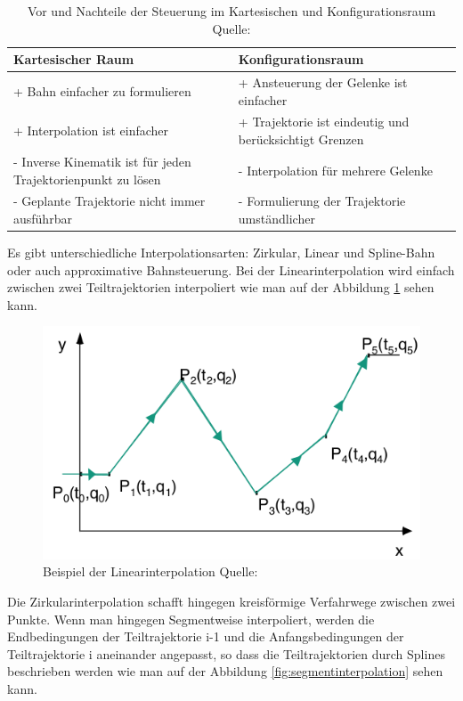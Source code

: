 \begin{table}[h]
		\centering
		\begin{tabular}{| p{7cm} | p{7cm}|}
\hline
\textbf{Kartesischer Raum} & \textbf{Konfigurationsraum}\\
\hline
+ Bahn einfacher zu formulieren & + Ansteuerung der Gelenke ist
einfacher\\
+ Interpolation ist einfacher & + Trajektorie ist eindeutig und
berücksichtigt Grenzen\\

- Inverse Kinematik ist für jeden Trajektorienpunkt zu lösen & - Interpolation für mehrere
Gelenke\\
- Geplante Trajektorie nicht immer ausführbar & - Formulierung der Trajektorie umständlicher\\
\hline
		\end{tabular}
		\caption{\label{fig:steurungProContra} Vor und Nachteile der Steuerung im Kartesischen und Konfigurationsraum Quelle: \citep{rob1}}
		\end{table}	
Es gibt unterschiedliche Interpolationsarten:  Zirkular, Linear und Spline-Bahn oder auch approximative Bahnsteuerung.
Bei der Linearinterpolation wird einfach zwischen zwei Teiltrajektorien interpoliert wie man auf der Abbildung \ref{fig:linearinterpolation} sehen kann.
\begin{figure}[h]
\center
\includegraphics[scale=0.35]{graphics/linearinterpolation.png}
\caption{\label{fig:linearinterpolation} Beispiel der Linearinterpolation Quelle: \citep{rob1}}
\end{figure}
 Die Zirkularinterpolation schafft hingegen kreisförmige Verfahrwege zwischen zwei Punkte. Wenn man hingegen  Segmentweise interpoliert, werden die Endbedingungen der Teiltrajektorie i-1 und die Anfangsbedingungen der Teiltrajektorie i aneinander angepasst, so dass die Teiltrajektorien durch Splines beschrieben werden wie man auf der Abbildung \ref{fig:segmentinterpolation} sehen kann.
